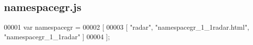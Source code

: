 \subsection{namespacegr.\+js}
\label{namespacegr_8js_source}

\begin{DoxyCode}
00001 var namespacegr =
00002 [
00003     [ \textcolor{stringliteral}{"radar"}, \textcolor{stringliteral}{"namespacegr\_1\_1radar.html"}, \textcolor{stringliteral}{"namespacegr\_1\_1radar"} ]
00004 ];
\end{DoxyCode}
